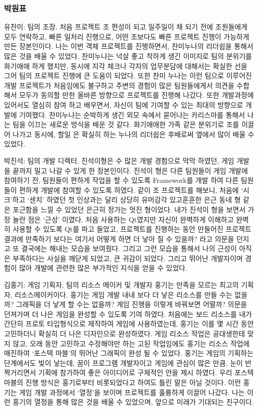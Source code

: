 \documentclass[10pt,oneside,a4paper,titlepage]{article}
\begin{document}
\subsubsection{박원표}
유찬미: 팀의 조장. 
처음 프로젝트 조 편성이 되고 일주일이 채 되기 전에 조원들에게 모두 연락하고, 빠른 일처리 진행으로, 어떤 조보다도 빠른 프로젝트 진행이 가능하게 만든 장본인이다. 나는 이번 객체 프로젝트를 진행하면서, 찬미누나의 리더쉽을 통해서 많은 것을 배울 수 있었다. 찬미누나는 넉살 좋고 착하게 생긴 이미지로 팀의 분위기를 화기애애 하게 했지만, 동시에 지각 체크나 각자의 업무분담에 대해서는 확실한 선을 그어 팀의 프로젝트 진행에 큰 도움이 되었다. 또한 찬미 누나는 이런 팀으로 이루어진 개발 프로젝트가 처음임에도 불구하고 주변의 경험이 많은 팀원들에게서 의견을 수합해서 모두가 동의할 만한 올바른 방향으로 프로젝트를 진행해 나갔다. 또한 개발과정에 있어서도 열심히 참여 하고 배우면서, 자신이 팀에 기여할 수 있는 최대의 방향으로 개발에 기여했다.
찬미누나는 순박하게 생긴 외모 속에서 묻어나는 카리스마를 통해서 나는 팀을 이끄는 새로운 방식을 배운 것 같다. 화기애애한 가족 같은 분위기로 조를 이끌어 나가고 동시에, 할일 은 확실히 하는 누나의 리더쉽은 후배로써 옆에서 많이 배울 수 있었다.

박진석: 팀의 개발 디렉터.
 진석이형은 수 많은 개발 경험으로 막막 하였던, 게임 개발을 끝까지 밀고 나갈 수 있게 한 장본인이다. 진석이 형은 다른 팀원들이 게임 개발에 참여하기 전, 팀원들이 편하게 작업을 할 수 있도록 Framework를 개발 하여 다른 팀원들이 편하게 개발에 참여할 수 있도록 하였다. 같이 조 프로젝트를 해보니, 처음에 ‘시크’하고 ‘센치’ 하였던 첫 인상과는 달리 상당히 유머감각 있고훈훈한 은근 동네 형 같은 포근함을 느낄 수 있었던 은근히 정가는 멋진 형이었다. 
	내가 진석이 형을 보면서 가장 놀란 점은 ‘근성’ 이였다. 처음 사용하는 Qt였지만 자신이 완벽하게 이해하고 완벽히 사용할 수 있도록 Qt를 파고 들었고, 프로젝트를 진행하는 동안 만들어진 프로젝트 결과에 만족하기 보다는 여기서 어떻게 하면 더 낳아 질 수 있을까? 라고 의문을 던지고 또 결국에는 해내는 모습을 보여줬다. 그리고 그런 모습을 통해서 나의 근성이 아직은 부족하다는 사실을 깨닫게 되었고, 큰 귀감이 되었다. 그리고 뛰어난 개발자이며 경험이 많아 개발에 관련한 많은 부가적인 지식을 얻을 수 있었다.

김홍기: 게임 기획자, 팀의 리소스 메이커 및 개발자
	홍기는 만족을 모르는 최고의 기획자, 리소스메이커이다. 홍기는 게임 개발 내내 보다 더 낳은 리소스를 만들 수는 없을까? 그래픽을 더 낳게 할 수는 없을까? 게임 진행을 이렇게 바꿔보면 어떨까? 의문을 던져가며 더 나은 게임을 완성할 수 있도록 기여 하였다. 처음에는 보드 리소스를 내가 간단히 프로토 타입형식으로 제작하여 게임에 사용하였는데, 홍기는 이를 몇 시간 동안 고민하더니 확실히 더 나은 디자인으로 완성하였다. 게임 리소스 작업은 공대생한테 맞지 않고, 오래 동안 고민하고 수정해야만 하는 고된 작업임에도 홍기는 리소스 작업에 매진하여 ‘포스텍 마블’의 뛰어난 그래픽이 완성 될 수 있었다.
	홍기는 게임의 기획하는 단계에서도 빛이 낳는데, 꿈이 프로그램 개발자이고 게임에 관심이 많은 만큼, 눈이 반짝거리면서 기획에 참가하여 좋은 아이디어로 구체적인 안을 제시 하였다. 우리 포스텍 마블의 진행 방식은 홍기로부터 비롯되었다고 하여도 틀린 말은 아닐 것이다. 
	이런 홍기는 게임 개발 과정에서 ‘열정’을 보이며 프로젝트를 훌륭하게 이끌어 나갔다. 나는 이런 홍기의 열정을 통해 많은 것을 배울 수 있었으며, 앞으로 미래가 기대되는 친구이다.
\end{document}
